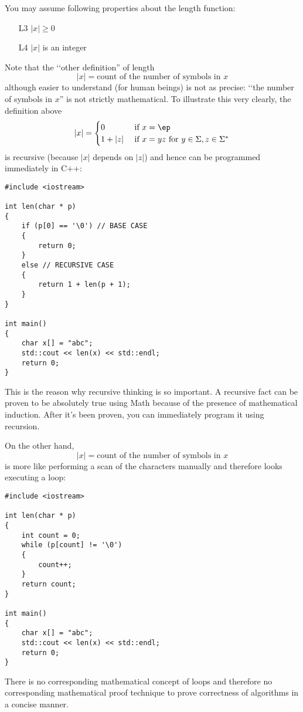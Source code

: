 You may assume following properties about the length function:
\begin{enumerate}
\item[L3] $|x| \geq 0$
\item[L4] $|x|$ is an integer 
\end{enumerate}

Note that the \lq\lq other definition'' of length 
\[
|x| = \text{count of the number of symbols in $x$}
\]
although easier to understand (for human beings) is not as precise:
\lq\lq the number of symbols in $x$'' is not strictly mathematical.
To illustrate this very clearly, the definition above
\[
|x| =
\begin{cases}
0       & \text{ if $x = \ep$} \\
1 + |z| & \text{ if $x = yz$ for $y \in \Sigma, z \in \Sigma^*$}
\end{cases}
\]
is recursive (because $|x|$ depends on $|z|$) and hence can be programmed
immediately in C++:

\begin{Verbatim}[frame=single]
#include <iostream>

int len(char * p)
{
    if (p[0] == '\0') // BASE CASE
    {
        return 0;
    }
    else // RECURSIVE CASE
    {
        return 1 + len(p + 1);
    }
}

int main()
{
    char x[] = "abc";
    std::cout << len(x) << std::endl;
    return 0;
}
\end{Verbatim}

This is the reason why recursive thinking is so important.
A recursive fact can be proven to be absolutely true using
Math because of the presence of mathematical induction.
After it's been proven, you can immediately program it using
recursion.

On the other hand, 
\[
|x| = \text{count of the number of symbols in $x$}
\]
is more like performing a scan of the characters manually and therefore looks
executing a loop:
\begin{Verbatim}[frame=single]
#include <iostream>

int len(char * p)
{
    int count = 0;
    while (p[count] != '\0')
    {
        count++;
    }
    return count;
}

int main()
{
    char x[] = "abc";
    std::cout << len(x) << std::endl;
    return 0;
}
\end{Verbatim}

There is no corresponding mathematical concept of loops
and therefore no corresponding mathematical proof technique to prove
correctness of algorithms in a concise manner.

